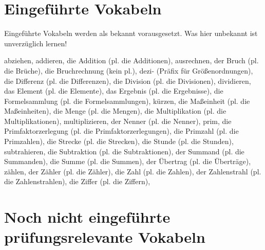 \section{Eingeführte Vokabeln}

Eingeführte Vokabeln werden als bekannt vorausgesetzt. Was hier unbekannt ist unverzüglich lernen!

abziehen,
addieren,
die Addition (pl. die Additionen),
ausrechnen,
der Bruch (pl. die Brüche),
die Bruchrechnung (kein pl.),
dezi- (Präfix für Größenordnungen),
die Differenz (pl. die Differenzen),
die Division (pl. die Divisionen),
dividieren,
das Element (pl. die Elemente),
das Ergebnis (pl. die Ergebnisse),
die Formelsammlung (pl. die Formelsammlungen),
kürzen,
die Maßeinheit (pl. die Maßeinheiten),
die Menge (pl. die Mengen),
die Multiplikation (pl. die Multiplikationen),
multiplizieren,
der Nenner (pl. die Nenner),
prim,
die Primfaktorzerlegung (pl. die Primfaktorzerlegungen),
die Primzahl (pl. die Primzahlen),
die Strecke (pl. die Strecken),
die Stunde (pl. die Stunden),
subtrahieren,
die Subtraktion (pl. die Subtraktionen),
der Summand (pl. die Summanden),
die Summe (pl. die Summen),
der Übertrag (pl. die Überträge),
zählen,
der Zähler (pl. die Zähler),
die Zahl (pl. die Zahlen),
der Zahlenstrahl (pl. die Zahlenstrahlen),
die Ziffer (pl. die Ziffern),

\section{Noch nicht eingeführte prüfungsrelevante Vokabeln}

